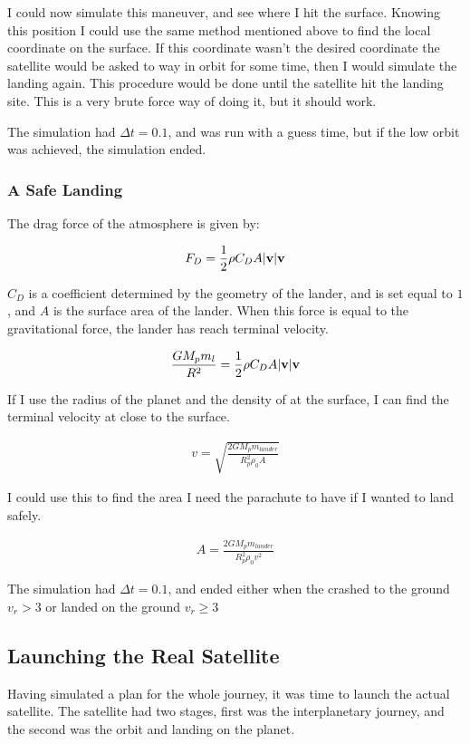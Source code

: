 \documentclass[a4paper, 10pt]{article}
\begin{document}
I could now simulate this maneuver, and see where I hit the surface. Knowing this position I could use the same method mentioned above to find the local coordinate on the surface. If this coordinate wasn't the desired coordinate the satellite would be asked to way in orbit for some time, then I would simulate the landing again. This procedure would be done until the satellite hit the landing site. This is a very brute force way of doing it, but it should work. 


The simulation had $\Delta t = 0.1$, and was run with a guess time, but if the low orbit was achieved, the simulation ended.

\subsubsection{A Safe Landing}

The drag force of the atmosphere is given by:

\begin{align}
F_D = \frac{1}{2}\rho C_D A |\bold{v}| \bold{v}
\end{align}

$C_D$ is a coefficient determined by the geometry of the lander, and is set equal to $1$, and $A$ is the surface area of the lander. When this force is equal to the gravitational force, the lander has reach terminal velocity.

\begin{align}
\frac{GM_p m_l}{R^2} = \frac{1}{2}\rho C_D A |\bold{v}| \bold{v}
\end{align}

If I use the radius of the planet and the density of at the surface, I can find the terminal velocity at close to the surface.

\begin{align}
v = \sqrt{\frac{2GM_p m_{lander}}{R_p^2 \rho_0 A}}
\end{align}

I could use this to find the area I need the parachute to have if I wanted to land safely. 

\begin{align}
A = \frac{2GM_p m_{lander}}{R_p^2 \rho_0 v^2}
\end{align}

The simulation had $\Delta t = 0.1$, and ended either when the crashed to the ground $v_r > 3$ or landed on the ground $v_r \geq 3$


\subsection{Launching the Real Satellite}
Having simulated a plan for the whole journey, it was time to launch the actual satellite. The satellite had two stages, first was the interplanetary journey, and the second was the orbit and landing on the planet.\\
\end{document}
